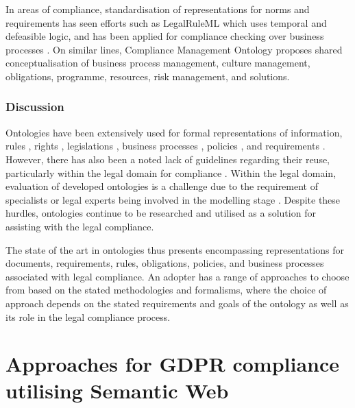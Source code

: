 In areas of compliance, standardisation of representations for norms and requirements has seen efforts such as LegalRuleML \cite{palmirani_legalruleml:_2011} which uses temporal and defeasible logic, and has been applied for compliance checking over business processes \cite{governatori_semantic_2016}. On similar lines, Compliance Management Ontology \cite{syed_abdullah_compliance_2012} proposes shared conceptualisation of business process management, culture management, obligations, programme, resources, risk management, and solutions.

\subsubsection*{Discussion}
Ontologies have been extensively used for formal representations of information, rules \cite{kirrane_scalable_2018}, rights \cite{pellegrini_genealogy_2018}, legislations \cite{leone_taking_2019}, business processes \cite{elgammal_formalizing_2016}, policies \cite{van_de_ven_qualitative_2016}, and requirements \cite{gharib_ontologies_2016}.
However, there has also been a noted lack of guidelines regarding their reuse, particularly within the legal domain for compliance \cite{casanovas_legal_2017}.
Within the legal domain, evaluation of developed ontologies is a challenge due to the requirement of specialists or legal experts being involved in the modelling stage \cite{rodrigues_legal_2019}.
Despite these hurdles, ontologies continue to be researched and utilised as a solution for assisting with the legal compliance.

The state of the art in ontologies thus presents encompassing representations for documents, requirements, rules, obligations, policies, and business processes associated with legal compliance. An adopter has a range of approaches to choose from based on the stated methodologies and formalisms, where the choice of approach depends on the stated requirements and goals of the ontology as well as its role in the legal compliance process.


\section{Approaches for GDPR compliance utilising Semantic Web}\label{sec:sota:gdpr-semweb}

